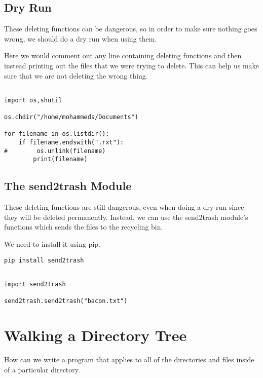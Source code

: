\documentclass[11pt]{article}
\begin{document}
\subsection{Dry Run}
\label{sec:org3426e47}

These deleting functions can be dangerous, so in order to make sure nothing goes wrong, we should do a dry run when using them.

Here we would comment out any line containing deleting functions and then instead printing out the files that we were trying to delete. This can help us make sure that we are not deleting the wrong thing.

\begin{verbatim}

import os,shutil

os.chdir("/home/mohammeds/Documents")

for filename in os.listdir():
    if filename.endswith(".rxt"):
#        os.unlink(filename)
        print(filename)

\end{verbatim}

\subsection{The send2trash Module}
\label{sec:org9d24fbf}

These deleting functions are still dangerous, even when doing a dry run since they will be deleted permanently. Instead, we can use the send2trash module's functions which sends the files to the recycling bin.

We need to install it using pip.

\begin{verbatim}
pip install send2trash
\end{verbatim}

\begin{verbatim}

import send2trash

send2trash.send2trash("bacon.txt")

\end{verbatim}
\section{Walking a Directory Tree}
\label{sec:orgb305243}

How can we write a program that applies to all of the directories and files inside of a particular directory.
\end{document}
